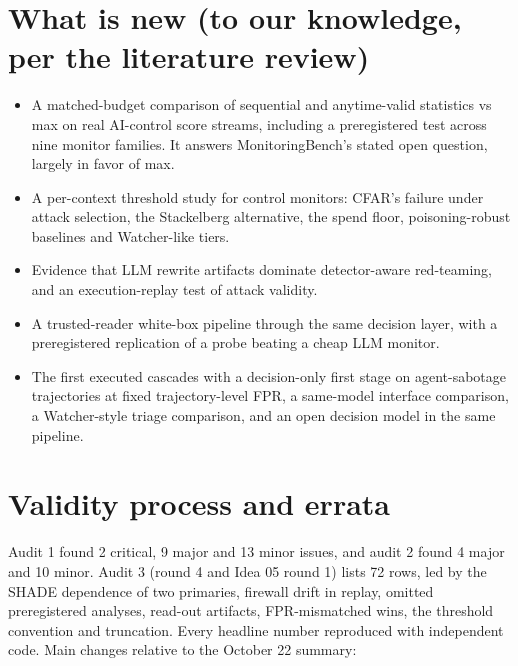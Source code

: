 \documentclass[11pt]{article}
\begin{document}
\section{What is new (to our knowledge, per the literature review)}
\begin{itemize}
\item A matched-budget comparison of sequential and anytime-valid statistics vs max on real AI-control score streams, including a preregistered test across nine monitor families. It answers MonitoringBench's stated open question, largely in favor of max.
\item A per-context threshold study for control monitors: CFAR's failure under attack selection, the Stackelberg alternative, the spend floor, poisoning-robust baselines and Watcher-like tiers.
\item Evidence that LLM rewrite artifacts dominate detector-aware red-teaming, and an execution-replay test of attack validity.
\item A trusted-reader white-box pipeline through the same decision layer, with a preregistered replication of a probe beating a cheap LLM monitor.
\item The first executed cascades with a decision-only first stage on agent-sabotage trajectories at fixed trajectory-level FPR, a same-model interface comparison, a Watcher-style triage comparison, and an open decision model in the same pipeline.
\end{itemize}

\section{Validity process and errata}
Audit 1 found 2 critical, 9 major and 13 minor issues, and audit 2 found 4 major and 10 minor. Audit 3 (round 4 and Idea 05 round 1) lists 72 rows, led by the SHADE dependence of two primaries, firewall drift in replay, omitted preregistered analyses, read-out artifacts, FPR-mismatched wins, the threshold convention and truncation. Every headline number reproduced with independent code. Main changes relative to the October 22 summary:
\end{document}
